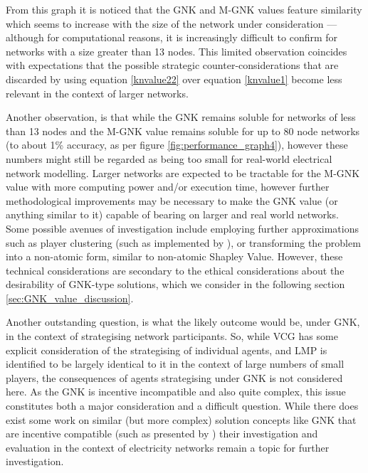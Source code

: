 From this graph it is noticed that the GNK and M-GNK values feature similarity which seems to increase with the size of the network under consideration --- although for computational reasons, it is increasingly difficult to confirm for networks with a size greater than 13 nodes.
This limited observation coincides with expectations that the possible strategic counter-considerations that are discarded by using equation \ref{knvalue22} over equation \ref{knvalue1} become less relevant in the context of larger networks.

Another observation, is that while the GNK remains soluble for networks of less than 13 nodes and the M-GNK value remains soluble for up to 80 node networks (to about 1\% accuracy, as per figure \ref{fig:performance_graph4}), however these numbers might still be regarded as being too small for real-world electrical network modelling.
Larger networks are expected to be tractable for the M-GNK value with more computing power and/or execution time, however further methodological improvements may be necessary to make the GNK value (or anything similar to it) capable of bearing on larger and real world networks.
Some possible avenues of investigation include employing further approximations such as player clustering (such as implemented by \cite{DBLP:journals/corr/abs-1903-10965}), or transforming the problem into a non-atomic form, similar to non-atomic Shapley Value.
However, these technical considerations are secondary to the ethical considerations about the desirability of GNK-type solutions, which we consider in the following section \ref{sec:GNK_value_discussion}.

Another outstanding question, is what the likely outcome would be, under GNK, in the context of strategising network participants.
So, while VCG has some explicit consideration of the strategising of individual agents, and LMP is identified to be largely identical to it in the context of large numbers of small players, the consequences of agents strategising under GNK is not considered here.
As the GNK is incentive incompatible and also quite complex, this issue constitutes both a major consideration and a difficult question.
While there does exist some work on similar (but more complex) solution concepts like GNK that are incentive compatible (such as presented by \cite{myerson1,Salamanca2019}) their investigation and evaluation in the context of electricity networks remain a topic for further investigation.




